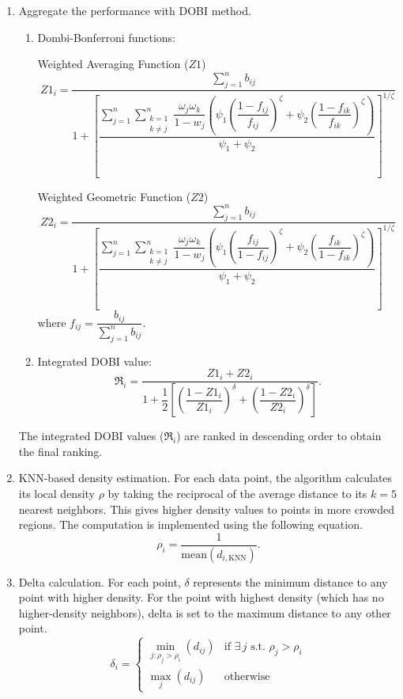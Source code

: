 \documentclass{article}
\begin{document}
\begin{enumerate}[label=\textbf{Step}~\arabic*.]
The entropy weight $w$ is computed through the following equation:
\[
w_{j} = \frac{1-E_{j}}{\sum_{j=1}^{n} (1-E_{j})},
\]
where
\[
E_{j} = -\frac{1}{\ln n} \sum_{i=1}^{n} b_{ij} \cdot \ln b_{ij}.
\]

\item Aggregate the performance with DOBI method.
\begin{enumerate}[label=(\arabic*)]
\item Dombi-Bonferroni functions:

Weighted Averaging Function ($Z1$)
\[
Z1_{i} = \frac{\sum_{j=1}^{n} b_{ij}}{1 + \left[\dfrac{\displaystyle\sum_{j=1}^{n}\sum_{\substack{k=1 \\ k \neq j}}^{n}\dfrac{\omega_{j}\omega_{k}}{1-w_{j}}\left(\psi_{1}\left(\dfrac{1-f_{ij}}{f_{ij}}\right)^{\zeta} + \psi_{2}\left(\dfrac{1-f_{ik}}{f_{ik}}\right)^{\zeta}\right)}{\psi_{1}+\psi_{2}}\right]^{1/\zeta}}
\]

Weighted Geometric Function ($Z2$)
\[
Z2_{i} = \frac{\sum_{j=1}^{n} b_{ij}}{1 + \left[\dfrac{\displaystyle\sum_{j=1}^{n}\sum_{\substack{k=1 \\ k \neq j}}^{n}\dfrac{\omega_{j}\omega_{k}}{1-w_{j}}\left(\psi_{1}\left(\dfrac{f_{ij}}{1-f_{ij}}\right)^{\zeta} + \psi_{2}\left(\dfrac{f_{ik}}{1-f_{ik}}\right)^{\zeta}\right)}{\psi_{1}+\psi_{2}}\right]^{1/\zeta}}
\]
where $f_{ij} = \dfrac{b_{ij}}{\sum_{j=1}^{n} b_{ij}}$.

\item Integrated DOBI value:
\[
\mathfrak{R}_{i} = \frac{Z1_{i}+Z2_{i}}{1+\dfrac{1}{2}\left[\left(\dfrac{1-Z1_{i}}{Z1_{i}}\right)^{\delta}+\left(\dfrac{1-Z2_{i}}{Z2_{i}}\right)^{\delta}\right]}.
\]
\end{enumerate}
The integrated DOBI values ($\mathfrak{R}_{i}$) are ranked in descending order to obtain the final ranking.

\item KNN-based density estimation.
For each data point, the algorithm calculates its local density $\rho$ by taking the reciprocal of the average distance to its $k=5$ nearest neighbors. This gives higher density values to points in more crowded regions. The computation is implemented using the following equation.
\[
\rho_{i} = \frac{1}{\mathrm{mean}(d_{i,\mathrm{KNN}})}.
\]

\item Delta calculation.
For each point, $\delta$ represents the minimum distance to any point with higher density. For the point with highest density (which has no higher-density neighbors), delta is set to the maximum distance to any other point.
\[
\delta_{i} =
\begin{cases}
\min_{j:\rho_{j}>\rho_{i}}(d_{ij}) & \text{if }\exists\, j\text{ s.t. }\rho_{j}>\rho_{i} \\
\max_{j}(d_{ij}) & \text{otherwise}
\end{cases}
\]


\end{enumerate}
\end{document}
